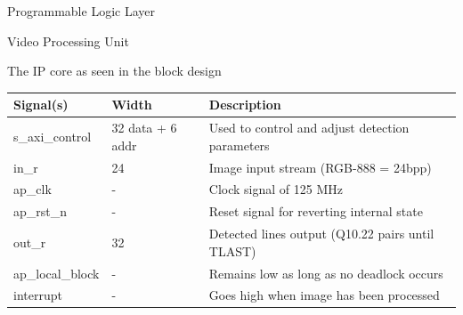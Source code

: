 \documentclass{matthijs}
\begin{document}
\begin{hoofdstuk}{Programmable Logic Layer}
\begin{paragraaf}{Video Processing Unit}
\begin{figuur}{The IP core as seen in the block design}
				{
				\small
				\begin{tabular}{l l l}
					\toprule
					Signal(s) & Width & Description \\
					\midrule
					s\_axi\_control & \qty{32}{\bit} data + \qty{6}{\bit} addr & Used to control and adjust detection parameters \\
					in\_r & \qty{24}{\bit} & Image input stream (RGB-888 = 24bpp) \\
					ap\_clk & - & Clock signal of 125 MHz \\
					ap\_rst\_n & - & Reset signal for reverting internal state \\
					out\_r & \qty{32}{\bit} & Detected lines output (Q10.22 pairs until TLAST) \\
					ap\_local\_block & - & Remains low as long as no deadlock occurs \\
					interrupt & - & Goes high when image has been processed \\
					\bottomrule
				\end{tabular}
				}
			\end{figuur}


\end{paragraaf}
\end{hoofdstuk}
\end{document}
